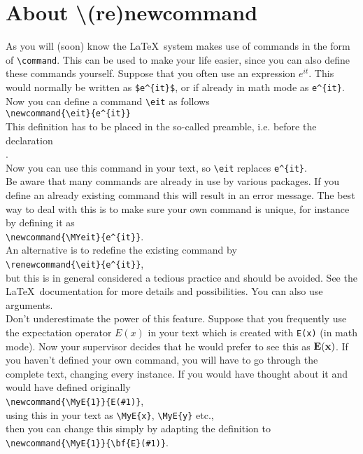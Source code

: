 \section{About {\textbackslash}(re)newcommand}
As you will (soon) know the \LaTeX\ system makes use of commands in
the form of \verb"\command". This can be used to make your life
easier, since you can also define these commands yourself. Suppose
that you often use an expression $e^{it}$. This would
normally be written as \verb"$e^{it}$", or if already in math mode
as \verb"e^{it}". Now you can define a command
\verb"\eit" as follows\\
\verb"\newcommand{\eit}{e^{it}}"\\
This definition has to be placed in the so-called preamble, i.e.
before the declaration\\ \verb"".\\ Now you can use
this
command in your text, so \verb"\eit" replaces \verb"e^{it}".\\
Be aware that many commands are already in use by various packages.
If you define an already existing command this will result in an
error message. The best way to deal with this is to make sure your
own command is unique, for instance by defining it as\\
\verb"\newcommand{\MYeit}{e^{it}}".\\
An alternative is to redefine the existing command by\\
\verb"\renewcommand{\eit}{e^{it}}",\\
but this is in general considered a tedious practice and should be
avoided.
See the \LaTeX\ documentation for more details and possibilities. You can also use arguments.\\
%
Don't underestimate the power of this feature. Suppose that you
frequently use the expectation operator $E(x)$ in your text which is
created with \verb"E(x)" (in math mode). Now your supervisor decides
that he would prefer to see this as $\bf{E}(x)$. If you haven't
defined your own command, you will have to go through the complete
text, changing every instance. If you would have thought about it
and
would have defined originally\\
\verb"\newcommand{\MyE{1}}{E(#1)}",\\
using this in your text as
\verb"\MyE{x}", \verb"\MyE{y}" etc.,\\
then you can change this simply by adapting the definition to\\
\verb"\newcommand{\MyE{1}}{\bf{E}(#1)}".

